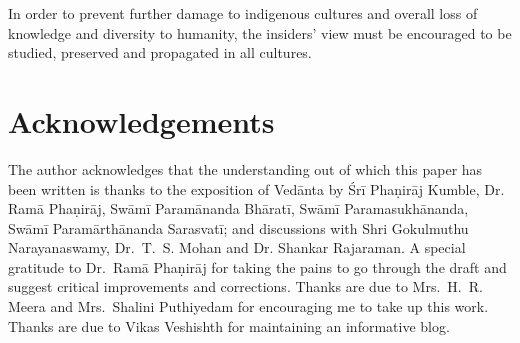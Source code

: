 In order to prevent further damage to indigenous cultures and overall loss of knowledge and diversity to humanity, the insiders' view must be encouraged to be studied, preserved and propagated in all cultures. 


\section*{Acknowledgements}

The author acknowledges that the understanding out of which this paper has been written is thanks to the exposition of Vedānta by Śrī Phaṇirāj Kumble, Dr. Ramā Phaṇirāj, Swāmī Paramānanda Bhāratī, Swāmī Paramasukhānanda, Swāmī Paramārthānanda Sarasvatī; and discussions with Shri Gokulmuthu Narayanaswamy, Dr.~T.~S. Mohan and Dr. Shankar Rajaraman. A special gratitude to Dr.~Ramā Phaṇirāj for taking the pains to go through the draft and suggest critical improvements and corrections. Thanks are due to Mrs.~H.~R. Meera and Mrs.~Shalini Puthiyedam for encouraging me to take up this work. Thanks are due to Vikas Veshishth for maintaining an informative blog.

\newpage

